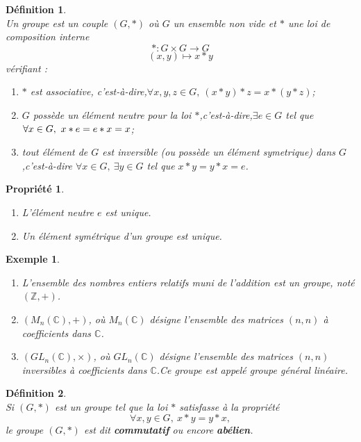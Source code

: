 \documentclass[a4paper, 14pt]{report}
\newtheorem{definition}{Définition}[section]
\newtheorem{example}{Exemple}[section]
\newtheorem{propriety}{Propriété}[section]
\begin{document}
\begin{onehalfspace}
{			
			\begin{definition} \cite{schaub1997} \\
				Un groupe est un couple  $(G,*)$ où $G$ un ensemble non vide et $*$ une loi de composition interne
				\[
				* : G \times G \longrightarrow G
				\]
				\[
				(x, y) \longmapsto x * y
				\]
				vérifiant :
				\begin{enumerate} [label=\roman*)]
					\item $*$ est associative, c'est-à-dire,\(\forall x, y, z \in G, \ (x * y) * z = x * (y * z)\);
					\item $G$ possède un élément neutre pour la loi $*$,c'est-à-dire,\(\exists e \in G\) tel que \(\forall x \in G, \\ \ x * e = e * x = x\);
					\item tout  élément de $G$ est inversible (ou possède un  élément symetrique) dans $G$,c'est-à-dire \(\forall x \in G, \ \exists y \in G\) tel que \(x * y = y * x = e\).
				\end{enumerate}
			\end{definition}
			
			\begin{propriety} \cite{schaub1997}
				\begin{enumerate}[label=\roman*)]
					\item L'élément neutre \(e\) est unique.
					\item Un élément symétrique d'un groupe est unique.
				\end{enumerate}
			\end{propriety}
			
			\begin{example} 
				\begin{enumerate} \
					\item L’ensemble des nombres entiers relatifs muni de l’addition est un groupe, noté \((\mathbb{Z}, +)\).
					\item \((M_n(\mathbb{C}), +)\), où \(M_n(\mathbb{C})\) désigne l’ensemble des matrices \((n, n)\) à coefficients dans \(\mathbb{C}\).
					\item \((GL_n(\mathbb{C}), \times)\), où \(GL_n(\mathbb{C})\) désigne l’ensemble des matrices \((n, n)\) inversibles à coefficients dans \(\mathbb{C}\).Ce groupe est appelé groupe général linéaire.
				\end{enumerate}
			\end{example}
			
			
			\begin{definition}  \cite{ribet2004graduate}\\
				Si \((G, \ast)\) est un groupe tel que la loi \(\ast\) satisfasse à la propriété
				\[
				\forall x, y \in G, \ x \ast y = y \ast x,
				\]
				le groupe \((G, \ast)\) est dit \textbf{commutatif} ou encore \textbf{abélien}.
			\end{definition}
			
}
\end{onehalfspace}
\end{document}
